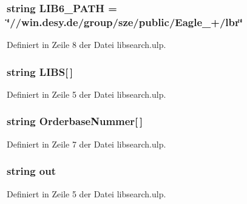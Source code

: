\subsubsection[{L\+I\+B6\+\_\+\+P\+A\+T\+H}]{\setlength{\rightskip}{0pt plus 5cm}string L\+I\+B6\+\_\+\+P\+A\+T\+H = \char`\"{}//win.\+desy.\+de/group/sze/public/Eagle\+\_+/lbr\char`\"{}}\label{libsearch_8ulp_a44dc1eefd5382033cf032f578a0130b9}


Definiert in Zeile 8 der Datei libsearch.\+ulp.

\hypertarget{libsearch_8ulp_ab79ee21fe4aae7937f99de5b9c7b7d2c}{}
\subsubsection[{L\+I\+B\+S}]{\setlength{\rightskip}{0pt plus 5cm}string L\+I\+B\+S\mbox{[}$\,$\mbox{]}}\label{libsearch_8ulp_ab79ee21fe4aae7937f99de5b9c7b7d2c}


Definiert in Zeile 5 der Datei libsearch.\+ulp.

\hypertarget{libsearch_8ulp_a57ba39a1335c8ae9ef4eb8314d51160e}{}
\subsubsection[{Orderbase\+Nummer}]{\setlength{\rightskip}{0pt plus 5cm}string Orderbase\+Nummer\mbox{[}$\,$\mbox{]}}\label{libsearch_8ulp_a57ba39a1335c8ae9ef4eb8314d51160e}


Definiert in Zeile 7 der Datei libsearch.\+ulp.

\hypertarget{libsearch_8ulp_a43b9274914173cbec050c89b07f1824b}{}
\subsubsection[{out}]{\setlength{\rightskip}{0pt plus 5cm}string out}\label{libsearch_8ulp_a43b9274914173cbec050c89b07f1824b}


Definiert in Zeile 5 der Datei libsearch.\+ulp.

\hypertarget{libsearch_8ulp_a801e8dfc827f7961b6012c0100f77ab4}{}
